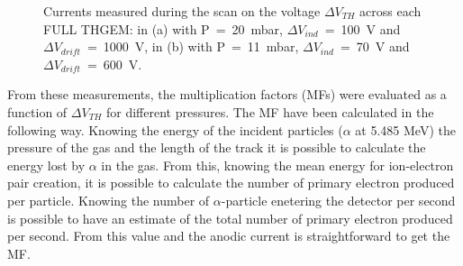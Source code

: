 \documentclass[a4paper, 11 pt]{report}
\newcommand{\Vind}{$\Delta V_{ind}$}
\newcommand{\Vthgem}{$\Delta V_{TH}$}
\newcommand{\Vdrift}{$ \Delta V_{drift}$}
\begin{document}
\begin{figure}[!htb]
	\centering
        \caption{Currents measured during the scan on the voltage \Vthgem{} across each FULL THGEM: 
        in (a) with P~=~20~mbar, \Vind~=~100~V and \Vdrift~=~1000~V, in (b) with P~=~11~mbar, 
        \Vind~=~70~V and \Vdrift~=~600~V.}
	\label{fig:thgem_FULLTHGEM_20and10mbar}
\end{figure}

From these measurements, the multiplication factors (MFs) were evaluated as a function of \Vthgem{} 
for different pressures.
The MF have been calculated in the following way. Knowing the energy of the incident particles 
($\alpha$ at 5.485 MeV) the pressure of the gas and the length of the track it is possible
to calculate the energy lost by $\alpha$ in the gas. From this, knowing the mean energy for
ion-electron pair creation, it is possible to calculate the number of primary electron produced
per particle. Knowing the number of $\alpha$-particle enetering the detector per second
is possible to have an estimate of the total number of primary electron produced per second.
From this value and the anodic current is straightforward to get the MF.
\end{document}
